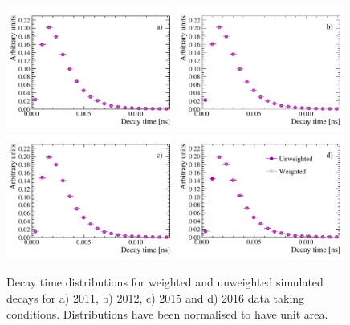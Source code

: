 \clearpage
\begin{figure}[tbp]
  \centering
    \includegraphics[width=0.49\textwidth]{./Figs/LifetimeMeasurement/2011_DT_Bs2MuMu.pdf}
    \includegraphics[width=0.49\textwidth]{./Figs/LifetimeMeasurement/2012_DT_Bs2MuMu.pdf}
    \includegraphics[width=0.49\textwidth]{./Figs/LifetimeMeasurement/2015_DT_Bs2MuMu.pdf}
    \includegraphics[width=0.49\textwidth]{./Figs/LifetimeMeasurement/2016_DT_Bs2MuMu.pdf}
  \caption{Decay time distributions for weighted and unweighted \bsmumu simulated decays for a) 2011, b) 2012, c) 2015 and d) 2016 data taking conditions. Distributions have been normalised to have unit area.}
  \label{fig:BsmmDT}
\end{figure}

